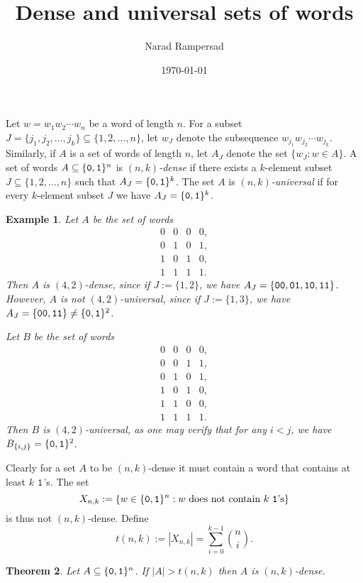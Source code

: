 \documentclass[12pt]{article}
\title{Dense and universal sets of words}
\author{Narad Rampersad}
\newtheorem{theorem}{Theorem}
\newtheorem{example}[theorem]{Example}
\begin{document}
\date{\today}
\maketitle

Let $w = w_1w_2 \cdots w_n$ be a word of length $n$.  For a subset $J
= \{j_1,j_2,\ldots,j_k\} \subseteq \{1,2,\ldots,n\}$, let $w_J$ denote
the subsequence $w_{j_1} w_{j_2} \cdots w_{j_k}$.  Similarly, if $A$
is a set of words of length $n$, let $A_J$ denote the set $\{ w_J : w
\in A\}$.  A set of words $A \subseteq \{{\tt 0,1}\}^n$ is
\emph{$(n,k)$-dense} if there exists a $k$-element subset $J \subseteq
\{1,2,\ldots,n\}$ such that $A_J = \{{\tt 0,1}\}^k$.  The set $A$ is
\emph{$(n,k)$-universal} if for every $k$-element subset $J$ we have $A_J
= \{{\tt 0,1}\}^k$.

\begin{example}\label{dense_univ}
Let $A$ be the set of words
\[
\begin{array}{cccc}
0 & 0 & 0 & 0,\\
0 & 1 & 0 & 1,\\
1 & 0 & 1 & 0,\\
1 & 1 & 1 & 1.
\end{array}
\]
Then $A$ is $(4,2)$-dense, since if $J := \{1,2\}$, we have $A_J =
\{{\tt 00,01,10,11}\}$.  However, $A$ is not $(4,2)$-universal, since
if $J := \{1,3\}$, we have $A_J = \{{\tt 00,11}\} \neq \{{\tt
  0,1}\}^2$.

Let $B$ be the set of words
\[
\begin{array}{cccc}
0 & 0 & 0 & 0,\\
0 & 0 & 1 & 1,\\
0 & 1 & 0 & 1,\\
1 & 0 & 1 & 0,\\
1 & 1 & 0 & 0,\\
1 & 1 & 1 & 1.
\end{array}
\]
Then $B$ is $(4,2)$-universal, as one may verify that for any $i < j$,
we have $B_{\{i,j\}} = \{{\tt 0,1}\}^2$.
\end{example}

Clearly for a set $A$ to be $(n,k)$-dense it must contain a word that
contains at least $k$ ${\tt 1}$'s.  The set
\[
X_{n,k} := \{w \in \{{\tt 0,1}\}^n : w \text{ does not contain $k$ {\tt 1}'s}\}
\]
is thus not $(n,k)$-dense.  Define
\[
t(n,k) := |X_{n,k}| = \sum_{i = 0}^{k-1} {n \choose i}.
\]

\begin{theorem}\label{nkdense}
Let $A \subseteq \{{\tt 0,1}\}^n$.  If $|A| > t(n,k)$ then $A$ is
$(n,k)$-dense.
\end{theorem}
\end{document}
